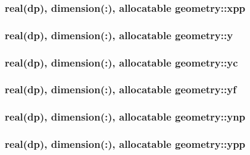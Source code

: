 \hypertarget{classgeometry_adb87ebbb8b31be2d1372108e5057ab11}{
\subsubsection[{xpp}]{\setlength{\rightskip}{0pt plus 5cm}real(dp), dimension(\-:), allocatable geometry\-::xpp}}\label{classgeometry_adb87ebbb8b31be2d1372108e5057ab11}
\hypertarget{classgeometry_a12fdb27cf84ec561b9c20625748e8f57}{
\subsubsection[{y}]{\setlength{\rightskip}{0pt plus 5cm}real(dp), dimension(\-:), allocatable geometry\-::y}}\label{classgeometry_a12fdb27cf84ec561b9c20625748e8f57}
\hypertarget{classgeometry_a23fc04ce2affc5bb7f3b1f3464feab40}{
\subsubsection[{yc}]{\setlength{\rightskip}{0pt plus 5cm}real(dp), dimension(\-:), allocatable geometry\-::yc}}\label{classgeometry_a23fc04ce2affc5bb7f3b1f3464feab40}
\hypertarget{classgeometry_a6f897e422e91f75c528d0c855a933271}{
\subsubsection[{yf}]{\setlength{\rightskip}{0pt plus 5cm}real(dp), dimension(\-:), allocatable geometry\-::yf}}\label{classgeometry_a6f897e422e91f75c528d0c855a933271}
\hypertarget{classgeometry_a2fd843e613749c67542f4377ed724ef9}{
\subsubsection[{ynp}]{\setlength{\rightskip}{0pt plus 5cm}real(dp), dimension(\-:), allocatable geometry\-::ynp}}\label{classgeometry_a2fd843e613749c67542f4377ed724ef9}
\hypertarget{classgeometry_a0e0c8bc792d7ff52c12df810cb39bde6}{
\subsubsection[{ypp}]{\setlength{\rightskip}{0pt plus 5cm}real(dp), dimension(\-:), allocatable geometry\-::ypp}}\label{classgeometry_a0e0c8bc792d7ff52c12df810cb39bde6}
